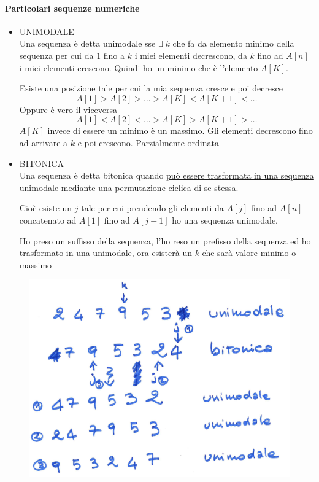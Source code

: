 \paragraph{Particolari sequenze numeriche}
\begin{itemize}
    \item UNIMODALE\\
    Una sequenza è detta unimodale sse $\exists\; k$ che fa da elemento minimo della sequenza per cui da $1$ fino a $k$ i miei elementi decrescono, da $k$ fino ad $A[n]$ i miei elementi crescono. Quindi ho un minimo che è l'elemento $A[K]$.

    Esiste una posizione tale per cui la mia sequenza cresce e poi decresce 
    $$A[1] > A[2] > \dots > A[K] < A[K+1] < \dots$$
    Oppure è vero il viceversa
    $$A[1] < A[2] < \dots > A[K] > A[K+1] > \dots$$
    $A[K]$ invece di essere un minimo è un massimo. Gli elementi decrescono fino ad arrivare a $k$ e poi crescono. \uline{Parzialmente ordinata}
    \item BITONICA\\
    Una sequenza è detta bitonica quando \uline{può essere trasformata in una sequenza unimodale mediante una permutazione ciclica di se stessa}.

    Cioè esiste un $j$ tale per cui prendendo gli elementi da $A[j]$ fino ad $A[n]$ concatenato ad $A[1]$ fino ad $A[j-1]$ ho una sequenza unimodale.

    Ho preso un suffisso della sequenza, l'ho reso un prefisso della sequenza ed ho trasformato in una unimodale, ora esisterà un $k$ che sarà valore minimo o massimo
\end{itemize}

\begin{figure}[h]
    \centering
    \includegraphics[scale=0.4]{images/bitonica1.png}
\end{figure}

